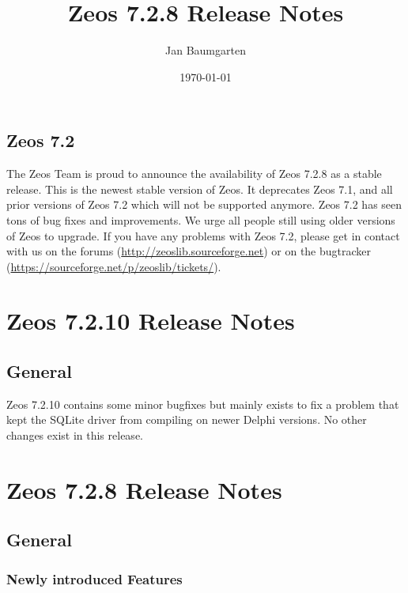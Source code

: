 \documentclass[a4paper,12pt,oneside]{book}
\title{Zeos 7.2.8 Release Notes}
\author{Jan Baumgarten}
\date{\today}
\begin{document}
\maketitle
\tableofcontents

\section*{Zeos 7.2}
The Zeos Team is proud to announce the availability of Zeos 7.2.8 as a stable release.
This is the newest stable version of Zeos.
It deprecates Zeos 7.1, and all prior versions of Zeos 7.2 which will not be supported anymore.
Zeos 7.2 has seen tons of bug fixes and improvements.
We urge all people still using older versions of Zeos to upgrade.
If you have any problems with Zeos 7.2, please get in contact with us on the forums (\url{http://zeoslib.sourceforge.net}) or on the bugtracker (\url{https://sourceforge.net/p/zeoslib/tickets/}).

\chapter{Zeos 7.2.10 Release Notes}

\section{General}
\label{sec:Rev8_General}
Zeos 7.2.10 contains some minor bugfixes but mainly exists to fix a problem that kept the SQLite driver from compiling on newer Delphi versions.
No other changes exist in this release.

\chapter{Zeos 7.2.8 Release Notes}

\section{General}
\label{sec:Rev10_General}

\subsection{Newly introduced Features}
\label{sec:Rev8_General_Features}
\end{document}
